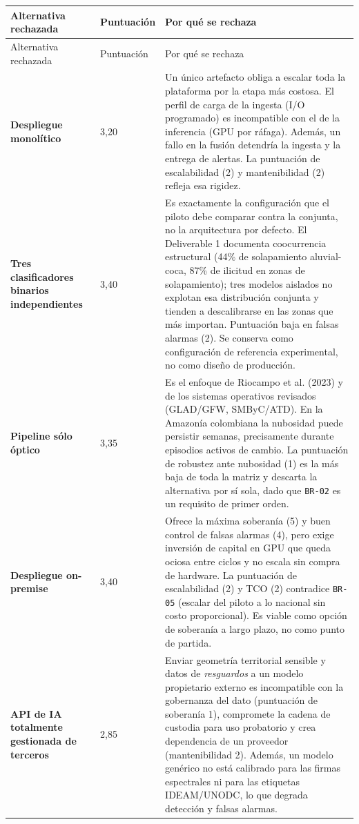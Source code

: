\documentclass{article}
\begin{document}
{\small
\begin{longtable}{@{}L{1.21in}L{0.75in}L{4.13in}@{}}
\toprule
Alternativa rechazada & Puntuación & Por qué se rechaza \\
\midrule
\endfirsthead
\toprule
Alternativa rechazada & Puntuación & Por qué se rechaza \\
\midrule
\endhead
\bottomrule
\endlastfoot
\textbf{Despliegue monolítico} & 3,20 & Un único artefacto obliga a escalar toda la plataforma por la etapa más costosa. El perfil de carga de la ingesta (I/O programado) es incompatible con el de la inferencia (GPU por ráfaga). Además, un fallo en la fusión detendría la ingesta y la entrega de alertas. La puntuación de escalabilidad (2) y mantenibilidad (2) refleja esa rigidez. \\
\textbf{Tres clasificadores binarios independientes} & 3,40 & Es exactamente la configuración que el piloto debe comparar contra la conjunta, no la arquitectura por defecto. El Deliverable 1 documenta coocurrencia estructural (44\% de solapamiento aluvial-coca, 87\% de ilicitud en zonas de solapamiento); tres modelos aislados no explotan esa distribución conjunta y tienden a descalibrarse en las zonas que más importan. Puntuación baja en falsas alarmas (2). Se conserva como configuración de referencia experimental, no como diseño de producción. \\
\textbf{Pipeline sólo óptico} & 3,35 & Es el enfoque de Riocampo et al. (2023) y de los sistemas operativos revisados (GLAD/GFW, SMByC/ATD). En la Amazonía colombiana la nubosidad puede persistir semanas, precisamente durante episodios activos de cambio. La puntuación de robustez ante nubosidad (1) es la más baja de toda la matriz y descarta la alternativa por sí sola, dado que \texttt{BR-\allowbreak{}02} es un requisito de primer orden. \\
\textbf{Despliegue on-premise} & 3,40 & Ofrece la máxima soberanía (5) y buen control de falsas alarmas (4), pero exige inversión de capital en GPU que queda ociosa entre ciclos y no escala sin compra de hardware. La puntuación de escalabilidad (2) y TCO (2) contradice \texttt{BR-\allowbreak{}05} (escalar del piloto a lo nacional sin costo proporcional). Es viable como opción de soberanía a largo plazo, no como punto de partida. \\
\textbf{API de IA totalmente gestionada de terceros} & 2,85 & Enviar geometría territorial sensible y datos de \emph{resguardos} a un modelo propietario externo es incompatible con la gobernanza del dato (puntuación de soberanía 1), compromete la cadena de custodia para uso probatorio y crea dependencia de un proveedor (mantenibilidad 2). Además, un modelo genérico no está calibrado para las firmas espectrales ni para las etiquetas IDEAM/UNODC, lo que degrada detección y falsas alarmas. \\
\end{longtable}
}
\end{document}
